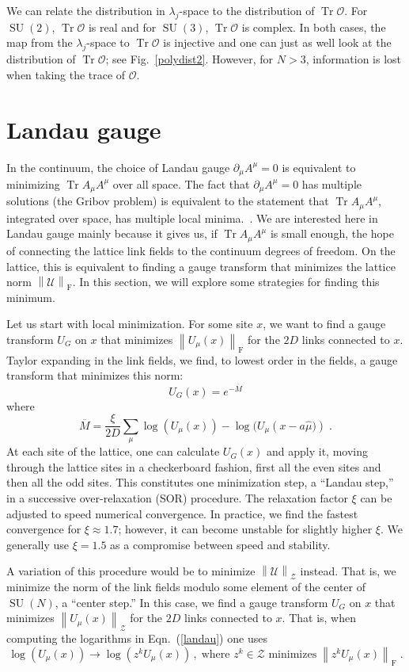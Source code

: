 \documentclass[preprint,aps,prd]{revtex4-2}
\newcommand{\be}{\begin{equation}}
\newcommand{\eq}{\end{equation}}
\newcommand{\zentrum}{\mathcal{Z}}       %
\newcommand{\config}{\mathcal{U}}
\newcommand{\orelax}{\xi}
\DeclareMathOperator{\SU}{SU}
\DeclareMathOperator{\Tr}{Tr}
\newcommand\fnorm[1]{\left\lVert #1 \right\rVert_\mathrm{F}}
\begin{document}
We can relate the distribution in $\lambda_j$-space to the
distribution of $\Tr\mathcal{O}$.
For $\SU(2)$, $\Tr \mathcal{O}$ is real and for $\SU(3)$, $\Tr \mathcal{O}$
is complex.  In both cases, the map from the $\lambda_j$-space to
$\Tr \mathcal{O}$ is injective and one can just as well look at the
distribution of $\Tr \mathcal{O}$; see Fig.~\ref{polydist2}.
However, for $N>3$, information is lost when taking the trace
of $\mathcal{O}$.

\section{Landau gauge}

In the continuum, the choice of Landau gauge $\partial_\mu A^\mu = 0$
is equivalent to minimizing $\Tr A_\mu A^\mu$ over all space.  The fact that
$\partial_\mu A^\mu = 0$ has multiple solutions (the Gribov problem) is
equivalent to the statement that $\Tr A_\mu A^\mu$, integrated over space,
has multiple local minima.~\cite{maas_more_2009}.
We are interested here in Landau gauge mainly
because it gives us, if $\Tr A_\mu A^\mu$ is small enough, the
hope of connecting the lattice
link fields to the continuum degrees of freedom.
On the lattice, this is equivalent to finding a gauge transform
that minimizes the lattice norm $\fnorm{\config}$.  In this
section, we will explore some strategies for finding this minimum.

Let us start with local minimization.
For some site $x$, we want to find a gauge transform $U_G$ on $x$
that minimizes $\fnorm{U_\mu(x)}$ for the $2D$
links connected to $x$.  Taylor expanding in the link fields,
we find, to lowest order in the fields, a gauge transform
that minimizes this norm:
%
\be
          U_G(x) = e^{- \overline{M}}
\eq
where
\be
   \overline{M} = \frac{\orelax}{2 D} \sum_\mu \log\left(U_\mu(x)\right) -
   \log(U_\mu\left(x-a \hat{\mu})\right)  \; . \label{landau}
\eq
At each site of the lattice, one can calculate $U_G(x)$ and apply it,
moving through the lattice sites in a checkerboard fashion,
first all the even sites and then all the odd sites.
This constitutes one minimization step, a ``Landau step,'' in a
successive over-relaxation (SOR) procedure.
The relaxation factor $\orelax$ can be adjusted to speed numerical
convergence.
In practice, we find the fastest convergence for $\orelax \approx 1.7$;
however, it can become unstable for slightly higher $\orelax$.
We generally use $\orelax=1.5$ as a compromise between speed and stability.

A variation of this procedure would be to minimize
$\left\lVert \config \right\rVert_\zentrum$ instead.
That is, we minimize the norm of the link
fields modulo some element of the center of $\SU(N)$, a ``center step.''
In this case, we find a gauge transform $U_G$ on $x$
that minimizes $\left\lVert U_\mu(x) \right\rVert_\zentrum$ for the $2D$
links connected to $x$.
That is, when computing the logarithms in Eqn.~(\ref{landau}) one uses
\be
\log\left(U_\mu(x)\right) \to \log\left(z^k U_\mu(x)\right)
\, , \;\mbox{
  where $z^k\in\zentrum$ minimizes}\; \fnorm{z^k U_\mu(x)} \;.
\eq
\end{document}
